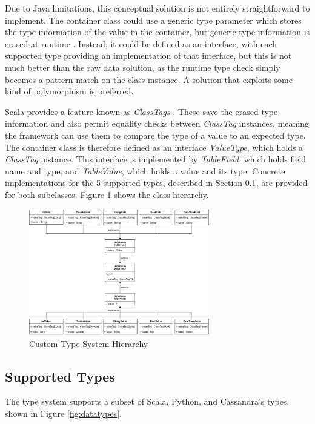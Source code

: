 Due to Java limitations, this conceptual solution is not entirely straightforward to implement. The container class could use a generic type parameter which stores the type information of the value in the container, but generic type information is erased at runtime \cite{ghosh2004generics}. Instead, it could be defined as an interface, with each supported type providing an implementation of that interface, but this is not much better than the raw data solution, as the runtime type check simply becomes a pattern match on the class instance. A solution that exploits some kind of polymorphism is preferred. 

Scala provides a feature known as \textit{ClassTags} \cite{scalaclasstags}. These save the erased type information and also permit equality checks between \textit{ClassTag} instances, meaning the framework can use them to compare the type of a value to an expected type. The container class is therefore defined as an interface \textit{ValueType}, which holds a \textit{ClassTag} instance. This interface is implemented by \textit{TableField}, which holds field name and type, and \textit{TableValue}, which holds a value and its type. Concrete implementations for the 5 supported types, described in Section \ref{subsec:supported-types}, are provided for both subclasses. Figure \ref{fig:type-system-hierarchy} shows the class hierarchy.

\begin{figure}[htp]
	\centering
	\includegraphics[width=0.7\textwidth]{chapters/diagrams/implementation/type-system-hierarchy}
	\caption{Custom Type System Hierarchy}
	\label{fig:type-system-hierarchy}
\end{figure}

\subsection{Supported Types}\label{subsec:supported-types}
The type system supports a subset of Scala, Python, and Cassandra's types, shown in Figure \ref{fig:datatypes}.

